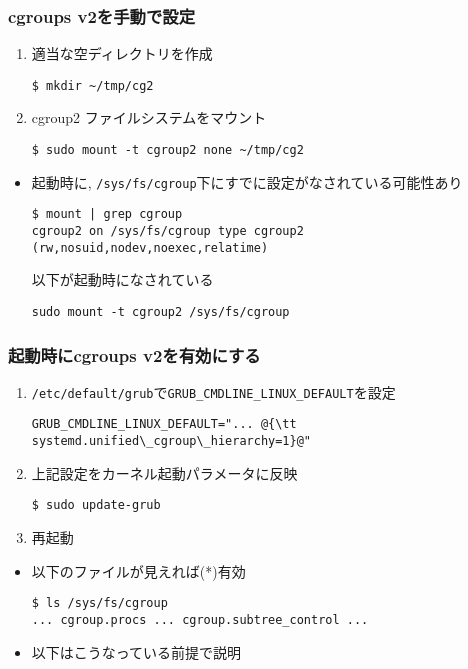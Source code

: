 \documentclass[12pt,dvipdfmx]{beamer}
\begin{document}
\begin{frame}[fragile]
  \frametitle{cgroups v2を手動で設定}
  \begin{enumerate}
  \item 適当な空ディレクトリを作成
\begin{lstlisting}
$ mkdir ~/tmp/cg2
\end{lstlisting} %
  \item cgroup2 ファイルシステムをマウント
\begin{lstlisting}
$ sudo mount -t cgroup2 none ~/tmp/cg2
\end{lstlisting} %
\end{enumerate}
\begin{itemize}
\item 起動時に, {\tt /sys/fs/cgroup}下にすでに設定がなされている可能性あり
\begin{lstlisting}
$ mount | grep cgroup
cgroup2 on /sys/fs/cgroup type cgroup2 (rw,nosuid,nodev,noexec,relatime)
\end{lstlisting} %
以下が起動時になされている
\begin{lstlisting}
sudo mount -t cgroup2 /sys/fs/cgroup
\end{lstlisting}
\end{itemize}
\end{frame}

\begin{frame}[fragile]
  \frametitle{起動時にcgroups v2を有効にする}
  \begin{enumerate}
  \item {\tt /etc/default/grub}で{\tt GRUB\_CMDLINE\_LINUX\_DEFAULT}を設定
\begin{lstlisting}
GRUB_CMDLINE_LINUX_DEFAULT="... @{\tt systemd.unified\_cgroup\_hierarchy=1}@"
\end{lstlisting}
\item 上記設定をカーネル起動パラメータに反映
\begin{lstlisting}
$ sudo update-grub
\end{lstlisting} %
\item 再起動
\end{enumerate}

\begin{itemize}
\item 以下のファイルが見えれば(*)有効
\begin{lstlisting}
$ ls /sys/fs/cgroup
... cgroup.procs ... cgroup.subtree_control ...
\end{lstlisting} %

\item 以下はこうなっている前提で説明
\end{itemize}
\end{frame}
\end{document}
